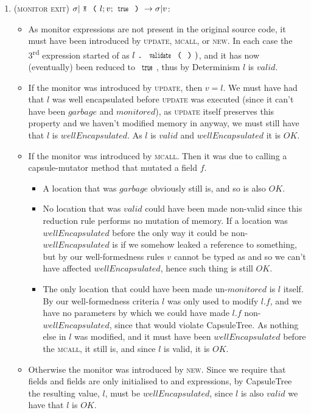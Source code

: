 \begin{enumerate}
\item (\textsc{monitor exit}) $\sigma|\Kw{M}\oR l; v;\Kw{true}\cR\rightarrow \sigma|v$:
\begin{itemize}
	\item As monitor expressions are not present in the original source code, it must have been introduced by \textsc{update}, \textsc{mcall}, or \textsc{new}. In each case the 3\textsuperscript{rd} expression started of as $l\singleDot\Kw{validate}\oR\cR)$, and it has now (eventually) been reduced to $\Kw{true}$, thus by Determinism $l$ is $valid$.

	\item  If the monitor was introduced by \textsc{update}, then $v = l$. We must have had that $l$ was well encapsulated before \textsc{update} was executed (since it can’t have been $garbage$ and $monitored$), as \textsc{update} itself preserves this property and we haven’t modified memory in anyway, we must still have that $l$ is $wellEncapsulated$. As $l$ is $valid$ and $wellEncapsulated$ it is $OK$.

	\item If the monitor was introduced by \textsc{mcall}. Then it was due to calling a capsule-mutator method that mutated a field $f$.
	\begin{itemize}
		\item A location that was $garbage$ obviously still is, and so is also $OK$.
		\item No location that was $valid$ could have been made non-valid since this reduction rule performs no mutation of memory. If a location was $wellEncapsulated$ before the only way it could be non-$wellEncapsulated$ is if we somehow leaked a \Q@mut@ reference to something, but by our well-formedness rules $v$ cannot be typed as \Q@mut@ and so we can’t have affected $wellEncapsulated$, hence such thing is still $OK$.
		\item The only location that could have been made un-$monitored$ is $l$ itself. By our well-formedness criteria $l$ was only used to modify $l.f$, and we have no parameters by which we could have made $l.f$ non-$wellEncapsulated$, since that would violate CapsuleTree. As nothing else in $l$ was modified, and it must have been $wellEncapsulated$ before the \textsc{mcall}, it still is, and since  $l$ is valid, it is $OK$.
	\end{itemize}
	\item Otherwise the monitor was introduced by \textsc{new}. Since we require that \Q@capsule@ fields and \Q@imm@ fields are only initialised to \Q@capsule@ and \Q@imm@ expressions, by CapsuleTree the resulting value, $l$, must be $wellEncapsulated$, since $l$ is also $valid$ we have that $l$ is $OK$.


\end{itemize}
\end{enumerate}
